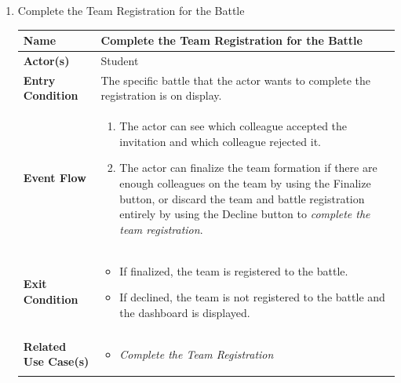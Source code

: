 \begin{enumerate}
\newpage

\item Complete the Team Registration for the Battle
\begin{center}
    \begin{tabular}{ | m{10em} | m{10cm}| } 
      \hline
      \textbf{Name} & Complete the Team Registration for the Battle  \\ 
      \hline
      \textbf{Actor(s)} & Student \\ 
      \hline
      \textbf{Entry Condition} & The specific battle that the actor wants to complete the registration is on display. \\ 
      \hline
      \textbf{Event Flow} & 
          \begin{enumerate}[(1)]
              \item The actor can see which colleague accepted the invitation and which colleague rejected it.
              \item The actor can finalize the team formation if there are enough colleagues on the team by using the Finalize button, or discard the team and battle registration entirely by using the Decline button to \textit{complete the team registration}.
          \end{enumerate}
      \\ 
      \hline
      \textbf{Exit Condition} & 
      \begin{itemize}
          \item If finalized, the team is registered to the battle.
          \item If declined, the team is not registered to the battle and the dashboard is displayed.
      \end{itemize}\\ 
      \hline
      \textbf{Related Use Case(s)} & 
      \begin{itemize}
          \item \textit{Complete the Team Registration}
      \end{itemize}
          \\ 
      \hline
    \end{tabular}
\end{center}



\end{enumerate}
